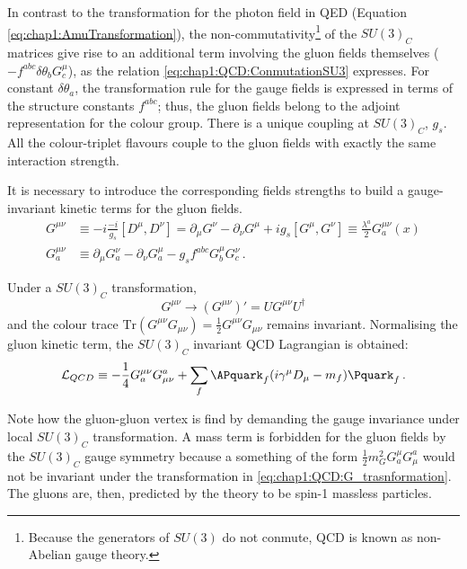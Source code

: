 In contrast to the transformation for the photon field in QED (Equation \ref{eq:chap1:AmuTransformation}), 
the non-commutativity\footnote{Because the generators of $SU(3)$ do not conmute, QCD is known as 
non-Abelian gauge theory.} of the $SU(3)_C$ matrices give rise to an additional term involving the gluon 
fields themselves ($- f^{abc}\delta \theta_{b}G_{c}^{\mu}$), as the relation \ref{eq:chap1:QCD:ConmutationSU3} expresses.
For constant $\delta \theta_{a}$, the transformation rule for the gauge fields is expressed in terms of the structure constants $f^{abc}$; 
thus, the gluon fields belong to the adjoint representation for the colour group. 
There is a unique coupling at $SU(3)_C$, $g_s$. All the colour-triplet flavours couple to the gluon fields with exactly the same interaction strength. 

It is necessary to introduce the corresponding fields strengths to build a gauge-invariant kinetic terms for the gluon fields.
\begin{align*}
	G^{\mu \nu}		& \equiv -i\frac{-i}{g_{s}} [D^{\mu}, D^{\nu}] =  \partial_{\mu}G^{\nu} - \partial_{\nu}G^{\mu} + i g_{s}[G^{\mu},G^{\nu}] \equiv \frac{\lambda^{a}}{2}G_{a}^{\mu \nu}(x) \\
	G_{a}^{\mu \nu}	& \equiv \partial_{\mu}G^{\nu}_{a} - \partial_{\nu}G^{\mu}_{a} - g_{s} f^{abc} G_{b}^{\mu}G_{c}^{\nu}\, .
\end{align*} 

Under a $SU(3)_C$ transformation,
\begin{equation}
	G^{\mu \nu} \rightarrow (G^{\mu \nu})' = UG^{\mu \nu}U^{\dagger}
\end{equation}
and the colour trace $\textrm{Tr}(G^{\mu \nu}G_{\mu \nu}) = \frac{1}{2}G^{\mu \nu}G_{\mu \nu}$ remains invariant.  Normalising the gluon kinetic term, 
the $SU(3)_C$ invariant QCD Lagrangian is obtained:
\begin{equation}\label{eq:chap1:QCD:Lagrangian_FinalCompact}
	\mathcal{L}_{QCD} \equiv   -\frac{1}{4}G^{\mu \nu}_{a}G_{\mu \nu}^{a} + \sum_{f} \APquark_{f} (i \gamma^{\mu} D_{\mu} - m_{f})\Pquark_{f} \, .
\end{equation}

Note how the gluon-gluon vertex is find by demanding the gauge invariance under local $SU(3)_C$ transformation.
A mass term is forbidden for the gluon fields by the $SU(3)_C$  gauge symmetry because a something of the form 
$\frac{1}{2}m^{2}_{G}G^{\mu}_{a}G_{\mu}^{a}$ would not be invariant under the transformation in \ref{eq:chap1:QCD:G_trasnformation}.
The gluons are, then, predicted by the theory to be spin-1 massless particles.

